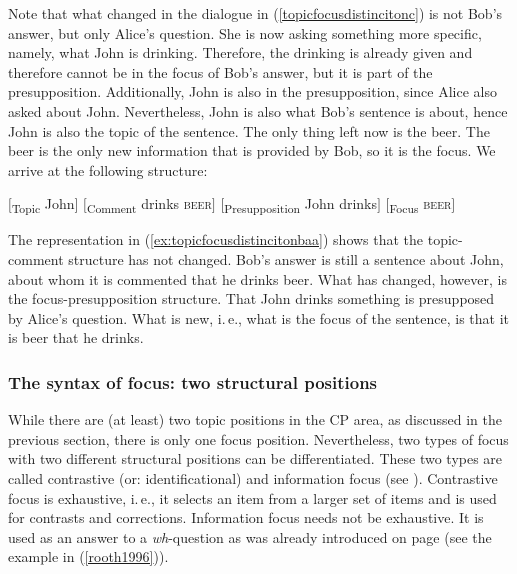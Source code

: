 \noindent Note that what changed in the dialogue in (\ref{topicfocusdistincitonc}) is not Bob's answer, but only Alice's question. She is now asking something more specific, namely, what John is drinking. Therefore, the drinking is already given and therefore cannot be in the focus of Bob's answer, but it is part of the presupposition. Additionally, John is also in the presupposition, since Alice also asked about John. Nevertheless, John is also what Bob's sentence is about, hence John is also the topic of the sentence. The only thing left now is the beer. The beer is the only new information that is provided by Bob, so it is the focus. We arrive at the following structure:

\begin{exe}
\ex\label{topicfocusdistincitond}\begin{xlist} 
\ex $[$\textsubscript{Topic} John$]$ $[$\textsubscript{Comment} drinks \textsc{beer}$]$ \label{ex:topicfocusdistincitonbaa}
\ex $[$\textsubscript{Presupposition} John drinks$]$ $[$\textsubscript{Focus} \textsc{beer}$]$ \label{ex:topicfocusdistincitonbbb}
\end{xlist}
\end{exe}

\noindent The representation in (\ref{ex:topicfocusdistincitonbaa}) shows that the topic-comment structure has not changed. Bob's answer is still a sentence about John, about whom it is commented that he drinks beer. What has changed, however, is the focus-presupposition structure. That John drinks something is presupposed by Alice's question. What is new, i.\,e., what is the focus of the sentence, is that it is beer that he drinks. 

\subsubsection{The syntax of focus: two structural positions}
While there are (at least) two topic positions in the CP area, as discussed in the previous section, there is only one focus position. Nevertheless, two types of focus with two different structural positions can be differentiated. These two types are called contrastive (or: identificational) and information focus (see \citealt{kiss1981structural}). Contrastive focus is exhaustive, i.\,e., it selects an item from a larger set of items and is used for contrasts and corrections. Information focus needs not be exhaustive. It is used as an answer to a \textit{wh}-question as was already introduced on page \pageref{rooth1996} (see the example in (\ref{rooth1996})). 

